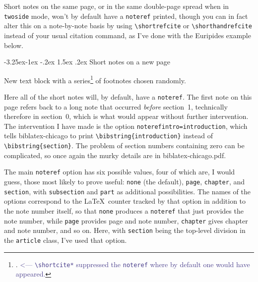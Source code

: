\documentclass[a4paper,12pt]{article}
\makeatletter
\renewcommand{\section}{\@startsection{section}{1}{\z@}%
                                     {-3.25ex\@plus -1ex \@minus -.2ex}%
                                     {1.5ex \@plus .2ex}%
                                     {\normalfont\large\bfseries}}
\newcommand{\cmd}[1]{\texttt{\textbackslash #1}}
\newcommand{\mylittlespace}{\vspace{5pt}}%
\makeatother
\begin{document}
\mylittlespace Short notes on the same page, or in the same double-page
spread when in \texttt{twoside} mode, won't by default have a
\texttt{noteref} printed, though you can in fact alter this on a
note-by-note basis by using \cmd{shortrefcite} or
\cmd{shorthandrefcite} instead of your usual citation command, as I've
done with the Euripides example below.

\clearpage

\section{Short notes on a new page}
\label{sec:three}

New\autocite{chicago:manual} text\autocite{garaud:gatine}
block\autocite{leo:madonna} with\autocite{schubert:muellerin}
a\autocite{mchugh:wake}
series\footnote{.
  \textcolor{DarkSlateBlue}{<--- \cmd{shortcite*} suppressed the
    \texttt{noteref} where by default one would have appeared.}}
of\autocite{clark:mesopot} footnotes\autocite{ashbrook:brain}
chosen\autocite{contrib:contrib} randomly.\autocite{frede:inproc}

\mylittlespace Here  all of the
short notes will, by default, have a \texttt{noteref}.  The first note
on this page refers back to a long note that occurred \emph{before}
section~1, technically therefore in section~0, which is what would
appear without further intervention.  The intervention I have made is
the option \verb+noterefintro=introduction+, which tells
\textsf{biblatex-chicago} to print \cmd{bibstring\{introduc\-tion\}}
instead of \verb+\bibstring{section}+.  The problem of section numbers
containing zero can be complicated, so once again the murky details
are in \textsf{biblatex-chicago.pdf}.

\mylittlespace The main \texttt{noteref} option has six possible
values, four of which are, I would guess, those most likely to prove
useful: \texttt{none} (the default), \texttt{page}, \texttt{chapter},
and \texttt{section}, with \texttt{subsection} and \texttt{part} as
additional possibilities.  The names of the options correspond to the
\LaTeX\ counter tracked by that option in addition to the note number
itself, so that \texttt{none} produces a \texttt{noteref} that just
provides the note number, while \texttt{page} provides page and note
number, \texttt{chapter} gives chapter and note number, and so on.
Here, with \texttt{section} being the top-level division in the
\texttt{article} class, I've used that option.
\end{document}
